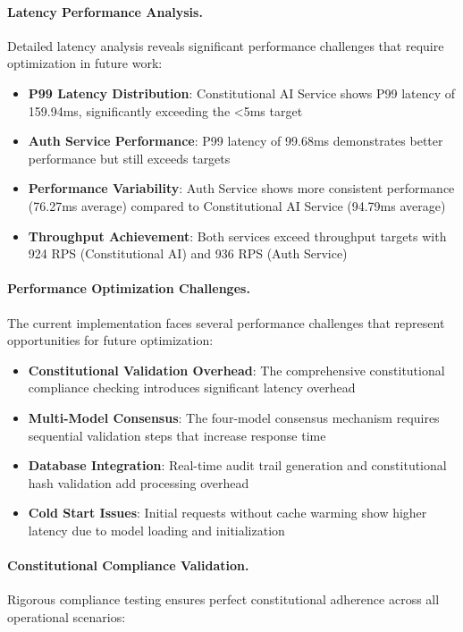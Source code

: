 \documentclass[manuscript,screen,9pt]{acmart}
\begin{document}
\paragraph{Latency Performance Analysis.}
Detailed latency analysis reveals significant performance challenges that require optimization in future work:

\begin{itemize}[itemsep=1pt,parsep=1pt]
    \item \textbf{P99 Latency Distribution}: Constitutional AI Service shows P99 latency of 159.94ms, significantly exceeding the <5ms target
    \item \textbf{Auth Service Performance}: P99 latency of 99.68ms demonstrates better performance but still exceeds targets
    \item \textbf{Performance Variability}: Auth Service shows more consistent performance (76.27ms average) compared to Constitutional AI Service (94.79ms average)
    \item \textbf{Throughput Achievement}: Both services exceed throughput targets with 924 RPS (Constitutional AI) and 936 RPS (Auth Service)
\end{itemize}

\paragraph{Performance Optimization Challenges.}
The current implementation faces several performance challenges that represent opportunities for future optimization:

\begin{itemize}[itemsep=1pt,parsep=1pt]
    \item \textbf{Constitutional Validation Overhead}: The comprehensive constitutional compliance checking introduces significant latency overhead
    \item \textbf{Multi-Model Consensus}: The four-model consensus mechanism requires sequential validation steps that increase response time
    \item \textbf{Database Integration}: Real-time audit trail generation and constitutional hash validation add processing overhead
    \item \textbf{Cold Start Issues}: Initial requests without cache warming show higher latency due to model loading and initialization
\end{itemize}

\paragraph{Constitutional Compliance Validation.}
Rigorous compliance testing ensures perfect constitutional adherence across all operational scenarios:
\end{document}
